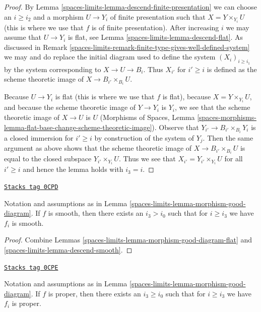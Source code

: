 \begin{proof}
By Lemma \ref{spaces-limits-lemma-descend-finite-presentation}
we can choose an $i \geq i_2$ and a morphism
$U \to Y_i$ of finite presentation such that $X = Y \times_{Y_i} U$
(this is where we use that $f$ is of finite presentation).
After increasing $i$ we may assume that $U \to Y_i$ is flat, see
Lemma \ref{spaces-limits-lemma-descend-flat}.
As discussed in Remark \ref{spaces-limits-remark-finite-type-gives-well-defined-system}
we may and do replace the initial diagram used to define the system
$(X_i)_{i \geq i_1}$ by the system corresponding to
$X \to U \to B_i$. Thus $X_{i'}$ for $i' \geq i$ is defined as
the scheme theoretic image of $X \to B_{i'} \times_{B_i} U$.

\medskip\noindent
Because $U \to Y_i$ is flat (this is where we use that $f$ is flat),
because $X = Y \times_{Y_i} U$, and
because the scheme theoretic image of $Y \to Y_i$ is $Y_i$,
we see that the scheme theoretic image of $X \to U$ is $U$
(Morphisms of Spaces, Lemma
\ref{spaces-morphisms-lemma-flat-base-change-scheme-theoretic-image}).
Observe that $Y_{i'} \to B_{i'} \times_{B_i} Y_i$ is a closed
immersion for $i' \geq i$ by construction of the system of $Y_j$.
Then the same argument as above shows that the scheme theoretic image
of $X \to B_{i'} \times_{B_i} U$
is equal to the closed subspace $Y_{i'} \times_{Y_i} U$.
Thus we see that $X_{i'} = Y_{i'} \times_{Y_i} U$ for all $i' \geq i$
and hence the lemma holds with $i_3 = i$.
\end{proof}

\begin{lemma}
\label{spaces-limits-lemma-morphism-good-diagram-smooth}
\href{https://stacks.math.columbia.edu/tag/0CPD}{\texttt{Stacks tag 0CPD}}

Notation and assumptions as in Lemma \ref{spaces-limits-lemma-morphism-good-diagram}.
If $f$ is smooth, then there exists an $i_3 > i_0$ such that for
$i \geq i_3$ we have $f_i$ is smooth.
\end{lemma}

\begin{proof}
Combine Lemmas \ref{spaces-limits-lemma-morphism-good-diagram-flat} and
\ref{spaces-limits-lemma-descend-smooth}.
\end{proof}

\begin{lemma}
\label{spaces-limits-lemma-morphism-good-diagram-proper}
\href{https://stacks.math.columbia.edu/tag/0CPE}{\texttt{Stacks tag 0CPE}}

Notation and assumptions as in Lemma \ref{spaces-limits-lemma-morphism-good-diagram}.
If $f$ is proper, then there exists an $i_3 \geq i_0$ such that for
$i \geq i_3$ we have $f_i$ is proper.
\end{lemma}

